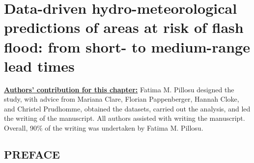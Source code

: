 \ClearShipoutPicture
{}

\chapter{Data-driven hydro-meteorological predictions of areas at risk of flash flood: from short- to medium-range lead times}
\label{data_driven_flash_floods_short_medium_range}
\graphicspath{{chapter_06/figures}{chapter_06/tables}}

\underline{\textbf{Authors' contribution for this chapter:}} Fatima M. Pillosu designed the study, with advice from Mariana Clare, Florian Pappenberger, Hannah Cloke, and Christel Prudhomme, obtained the datasets, carried out the analysis, and led the writing of the manuscript. All authors assisted with writing the manuscript. Overall, 90\% of the writing was undertaken by Fatima M. Pillosu.

\vspace{\baselineskip}

\section*{PREFACE}

